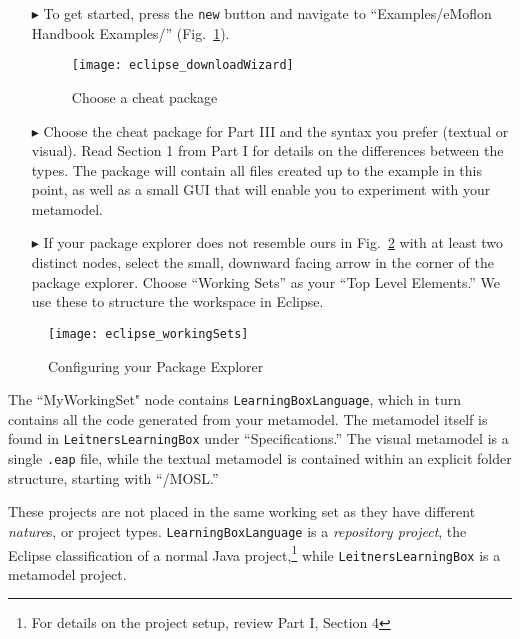 \begin{itemize}

\item[$\blacktriangleright$] To get started, press the \texttt{new} button and navigate to ``Examples/eMoflon Handbook Examples/''
(Fig.~\ref{fig:downloadWizard}).

\begin{figure}[htbp]
	\centering
  \texttt{[image: eclipse\_downloadWizard]}
	\caption{Choose a cheat package}
	\label{fig:downloadWizard}
\end{figure}

\item[$\blacktriangleright$] Choose the cheat package for Part III and the syntax you prefer (textual or visual). Read Section 1 from Part I for details on
the differences between the types. The package will contain all files created up to the example in this point, as well as a small GUI that will enable you to
experiment with your metamodel.

\newpage

\vspace*{0.5cm}

\item[$\blacktriangleright$] If your package explorer does not resemble ours in Fig.~\ref{fig:workingSets} with at least two distinct nodes, select the
small, downward facing arrow in the corner of the package explorer. Choose ``Working Sets'' as your ``Top Level Elements.'' We use these to structure the
workspace in Eclipse.

\vspace{0.75cm}

\end{itemize}

\begin{figure}[htbp]
	\centering
  \texttt{[image: eclipse\_workingSets]}
	\caption{Configuring your Package Explorer}
	\label{fig:workingSets}
\end{figure}

The ``MyWorkingSet" node contains \texttt{Learn\-ing\-Box\-Lang\-uage}, which in turn contains all the code generated from your metamodel. The metamodel itself
is found in \texttt{Leit\-ners\-Learn\-ing\-Box} under ``Specifications.'' The visual metamodel is a single \texttt{.eap} file, while the textual metamodel is
contained within an explicit folder structure, starting with ``/MOSL.'' 

These projects are not placed in the same working set as they have different \emph{nature}s, or project types. \texttt{Learning\-Box\-Language} is a
\emph{repository project}, the Eclipse classification of a normal Java project,\footnote{For details on the project setup, review Part I, Section 4}
while \texttt{LeitnersLearningBox} is a metamodel project.

